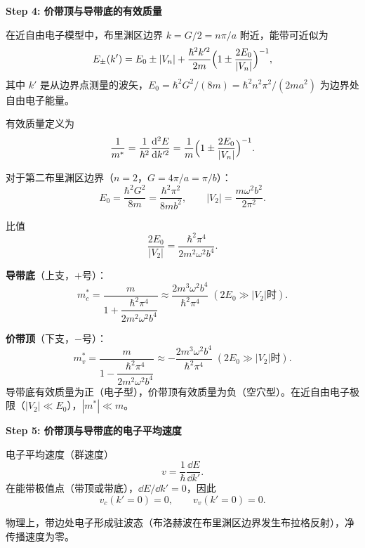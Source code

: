 \begin{derivationbox}[标准解题过程]
\textbf{Step 4: 价带顶与导带底的有效质量}

在近自由电子模型中，布里渊区边界 $k=G/2=n\pi/a$ 附近，能带可近似为
\begin{equation}
E_{\pm}(k')=E_0\pm|V_n|+\frac{\hbar^2k'^2}{2m}\Bigl(1\pm\frac{2E_0}{|V_n|}\Bigr)^{-1},
\end{equation}
其中 $k'$ 是从边界点测量的波矢，$E_0=\hbar^2G^2/(8m)=\hbar^2n^2\pi^2/(2ma^2)$ 为边界处自由电子能量。

有效质量定义为
\begin{equation}
\frac{1}{m^*}=\frac{1}{\hbar^2}\frac{\dd^2E}{\dd k'^2}=\frac{1}{m}\Bigl(1\pm\frac{2E_0}{|V_n|}\Bigr)^{-1}.
\end{equation}

对于第二布里渊区边界（$n=2$，$G=4\pi/a=\pi/b$）：
\begin{equation}
E_0=\frac{\hbar^2G^2}{8m}=\frac{\hbar^2\pi^2}{8mb^2},\qquad |V_2|=\frac{m\omega^2b^2}{2\pi^2}.
\end{equation}

比值
\begin{equation}
\frac{2E_0}{|V_2|}=\frac{\hbar^2\pi^4}{2m^2\omega^2b^4}.
\end{equation}

\textbf{导带底}（上支，$+$号）：
\begin{equation}
\boxed{m_c^*=\frac{m}{1+\dfrac{\hbar^2\pi^4}{2m^2\omega^2b^4}}\approx\frac{2m^3\omega^2b^4}{\hbar^2\pi^4}\;(2E_0\gg|V_2|\text{时}).}
\end{equation}

\textbf{价带顶}（下支，$-$号）：
\begin{equation}
\boxed{m_v^*=\frac{m}{1-\dfrac{\hbar^2\pi^4}{2m^2\omega^2b^4}}\approx-\frac{2m^3\omega^2b^4}{\hbar^2\pi^4}\;(2E_0\gg|V_2|\text{时}).}
\end{equation}
导带底有效质量为正（电子型），价带顶有效质量为负（空穴型）。在近自由电子极限（$|V_2|\ll E_0$），$|m^*|\ll m$。

\textbf{Step 5: 价带顶与导带底的电子平均速度}

电子平均速度（群速度）
\begin{equation}
v=\frac{1}{\hbar}\frac{\dd E}{\dd k'}.
\end{equation}
在能带极值点（带顶或带底），$\dd E/\dd k'=0$，因此
\begin{equation}
\boxed{v_c(k'=0)=0,\qquad v_v(k'=0)=0.}
\end{equation}

物理上，带边处电子形成驻波态（布洛赫波在布里渊区边界发生布拉格反射），净传播速度为零。
\end{derivationbox}

